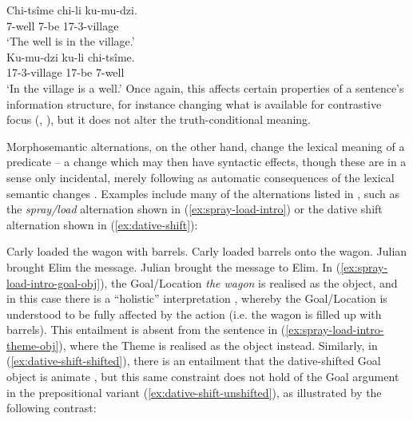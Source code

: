 \documentclass[output=paper]{langscibook}
\begin{document}
\ea\label{ex:locative-inversion}
\ea
\gll Chi-ts\^{i}me chi-li    ku-mu-dzi. \\
7-well        7-be 17-3-village\\
\glt `The well is in the village.'\label{ex:uninverted}\\[0.5em]
%
\ex
\gll Ku-mu-dzi     ku-li       chi-ts\^{i}me. \\
17-3-village  17-be  7-well\\
\glt `In the village is a well.'\label{ex:inverted}%
\z \z
%
Once again, this affects certain properties of a sentence's information
structure, for instance changing what is available for contrastive focus
(\citealp[35]{bresnan1989locative}, \citealp[86--87]{Bresnan:Architecture}), but
it does not alter the truth-conditional meaning.

Morphosemantic alternations, on the other hand, change the lexical meaning of a
predicate -- a change which may then have syntactic effects, though these are in
a sense only incidental, merely following as automatic consequences of the
lexical semantic changes \citep[374]{Kibort2004}. Examples include many of the
alternations listed in \citet{levin93}, such as the \textit{spray\slash load}
alternation shown in (\ref{ex:spray-load-intro}) or the dative shift alternation
shown in (\ref{ex:dative-shift}):

\ea\label{ex:spray-load-intro}%
\ea Carly loaded the wagon with barrels.\label{ex:spray-load-intro-goal-obj}%
\ex Carly loaded barrels onto the wagon.\label{ex:spray-load-intro-theme-obj}%
\z%
\ex\label{ex:dative-shift}%
\ea Julian brought Elim the message.\label{ex:dative-shift-shifted}%
\ex Julian brought the message to Elim.\label{ex:dative-shift-unshifted}%
\z%
\z
%
In (\ref{ex:spray-load-intro-goal-obj}), the Goal\slash Location \textit{the
  wagon} is realised as the object, and in this case there is a ``holistic''
interpretation \citep[50]{levin93}, whereby the Goal\slash Location is
understood to be fully affected by the action (i.e. the wagon is filled up with
barrels). This entailment is absent from the sentence in
(\ref{ex:spray-load-intro-theme-obj}), where the Theme is realised as the object
instead. Similarly, in (\ref{ex:dative-shift-shifted}), there is an entailment
that the dative-shifted Goal object is animate
\citep[146--147]{goldberg1995constructions},
but this same constraint does not
hold of the Goal argument in the prepositional variant
(\ref{ex:dative-shift-unshifted}), as illustrated by the following contrast:
\end{document}
